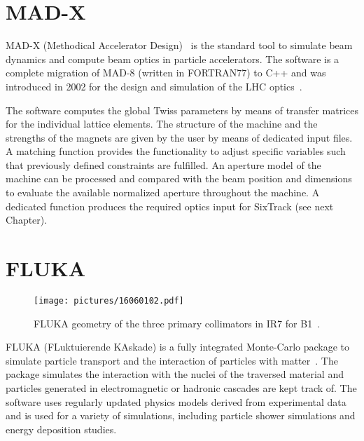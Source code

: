 \section{MAD-X}
MAD-X (Methodical Accelerator Design)~\cite{MADXref01} is the standard tool to simulate beam dynamics and compute beam optics in particle accelerators. The software is a complete migration of MAD-8 (written in FORTRAN77) to C++ and was introduced in 2002 for the design and simulation of the LHC optics~\cite{MADXref02}.

The software computes the global Twiss parameters by means of transfer matrices for the individual lattice elements. The structure of the machine and the strengths of the magnets are given by the user by means of dedicated input files. A matching function provides the functionality to adjust specific variables such that previously defined constraints are fulfilled. An aperture model of the machine can be processed and compared with the beam position and dimensions to evaluate the available normalized aperture throughout the machine. A dedicated function produces the required optics input for SixTrack (see next Chapter). 




\section{FLUKA}


\begin{figure}[t]  
    \centering
    \texttt{[image: pictures/16060102.pdf]}
    \caption{FLUKA geometry of the three primary collimators in IR7 for B1~\cite{skordis_fluka_model}.}  
    \label{pic:16031201}
\end{figure}


FLUKA (FLuktuierende KAskade) is a fully integrated Monte-Carlo package to simulate particle transport and the interaction of particles with matter~\cite{ferrari2005fluka}. The package simulates the interaction with the nuclei of the traversed material and particles generated in electromagnetic or hadronic cascades are kept track of. The software uses regularly updated physics models derived from experimental data and is used for a variety of simulations, including particle shower simulations and energy deposition studies. 

